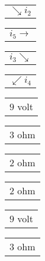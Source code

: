 \documentclass{book}
\begin{document}
\stopmpxshipout
\mpxshipout%
{\small \renewcommand{\arraystretch}{.9}
              \begin{tabular}[t]{@{}l@{}}
                  $\searrow i_2$    
              \end{tabular}}%
\stopmpxshipout
\mpxshipout%
{\small \renewcommand{\arraystretch}{.9}
              \begin{tabular}[b]{@{}c@{}}
                  $i_5\rightarrow$     
              \end{tabular}}%
\stopmpxshipout
\mpxshipout%
{\small \renewcommand{\arraystretch}{.9}
              \begin{tabular}[t]{@{}r@{}}
                  $i_3\searrow$    
              \end{tabular}}%
\stopmpxshipout
\mpxshipout%
{\small \renewcommand{\arraystretch}{.9}
              \begin{tabular}[t]{@{}l@{}}
                  $\swarrow i_4$    
              \end{tabular}}%
\stopmpxshipout
\mpxshipout%
{\small \renewcommand{\arraystretch}{.9}
                \circuitfont\begin{tabular}{@{}l}
                   $9$ volt 
	        \end{tabular}}%
\stopmpxshipout
\mpxshipout%
{\small \renewcommand{\arraystretch}{.9}
                \circuitfont\begin{tabular}[t]{@{}c}
                   $3$ ohm 
	        \end{tabular}}%
\stopmpxshipout
\mpxshipout%
{\small \renewcommand{\arraystretch}{.9}
                \circuitfont\begin{tabular}{@{}r}
                   $2$ ohm 
	        \end{tabular}}%
\stopmpxshipout
\mpxshipout%
{\small \renewcommand{\arraystretch}{.9}
                \circuitfont\begin{tabular}[b]{@{}c}
                   $2$ ohm 
	        \end{tabular}}%
\stopmpxshipout
\mpxshipout%
{\small \renewcommand{\arraystretch}{.9}
                \circuitfont\begin{tabular}{@{}l}
                   $9$ volt 
	        \end{tabular}}%
\stopmpxshipout
\mpxshipout%
{\small \renewcommand{\arraystretch}{.9}
                \circuitfont\begin{tabular}[t]{@{}c}
                   $3$ ohm 
	        \end{tabular}}%
\end{document}
